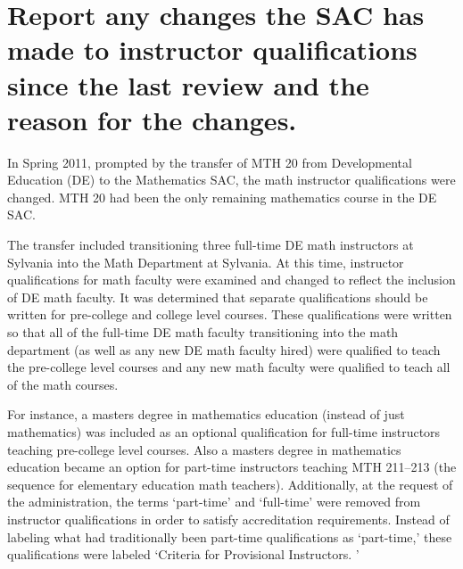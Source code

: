 



\section[Changes to instructor qualifications]{Report any changes the SAC has
  made to instructor qualifications since
  the last review and the reason for the changes.}
In Spring 2011, prompted by the transfer of MTH 20 from Developmental Education (DE) to the Mathematics SAC, the math instructor qualifications were changed.
MTH 20 had been the only remaining mathematics course in the DE SAC.

The transfer included transitioning three full-time DE math instructors at Sylvania into the Math Department at Sylvania.
At this time, instructor qualifications for math faculty were examined and changed to reflect the inclusion of DE math faculty.
It was determined that separate qualifications should be written for pre-college and college level courses.
These qualifications were written so that all of the full-time DE math faculty transitioning into the math department (as well as any new DE math faculty hired) were qualified to teach the pre-college level courses and any new math faculty were qualified to teach all of the math courses.

For instance, a masters degree in mathematics education (instead of just mathematics) was included as an optional qualification for full-time instructors teaching pre-college level courses.
Also a masters degree in mathematics education became an option for part-time instructors teaching MTH 211--213 (the sequence for elementary education math teachers).
Additionally, at the request of the administration, the terms `part-time' and `full-time' were removed from instructor qualifications in order to satisfy accreditation requirements.
Instead of labeling what had traditionally been part-time qualifications as `part-time,' these qualifications were labeled `Criteria for Provisional Instructors.
'

